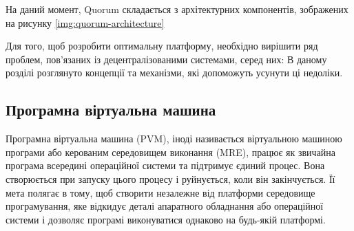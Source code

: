 \documentclass{lib/styles/default-style}
\begin{document}

    На даний момент, Quorum складається з архітектурних компонентів, зображених на рисунку \ref{img:quorum-architecture}



    Для того, щоб розробити оптимальну платформу, необхідно вирішити ряд проблем,
    пов'язаних із децентралізованими системами, серед них:
    В даному розділі розглянуто концепції та механізми, які допоможуть усунути ці недоліки.

\subsection{Програмна віртуальна машина}

    Програмна віртуальна машина (PVM), іноді називається віртуальною машиною програми
    або керованим середовищем виконання (MRE), 
    працює як звичайна програма всередині операційної системи та підтримує єдиний процес.
    Вона створюється при запуску цього процесу і руйнується, коли він закінчується.
    Її мета полягає в тому, щоб створити незалежне від платформи середовище програмування,
    яке відкидує деталі апаратного обладнання або операційної системи і
    дозволяє програмі виконуватися однаково на будь-якій платформі.
\end{document}
